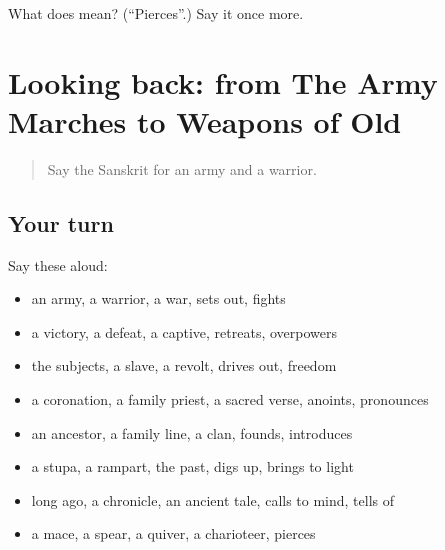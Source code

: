 \begin{tcolorbox}[breakable,colback=teal!4,colframe=teal!35!black,title={Before you move on}]
What does  mean? (\textquotedblleft{}Pierces\textquotedblright{}.) Say it once more.
\end{tcolorbox}
\section[(dialogue)]{Looking back: from The Army Marches to Weapons of Old}

\label{lesson:SA-R325-review-318-325}



\begin{quote}
Say the Sanskrit for an army and a warrior.
\end{quote}

\subsection*{Your turn}
Say these aloud:

\begin{itemize}
\raggedright
  \item an army, a warrior, a war, sets out, fights
  \item a victory, a defeat, a captive, retreats, overpowers
  \item the subjects, a slave, a revolt, drives out, freedom
  \item a coronation, a family priest, a sacred verse, anoints, pronounces
  \item an ancestor, a family line, a clan, founds, introduces
  \item a stupa, a rampart, the past, digs up, brings to light
  \item long ago, a chronicle, an ancient tale, calls to mind, tells of
  \item a mace, a spear, a quiver, a charioteer, pierces
\end{itemize}

